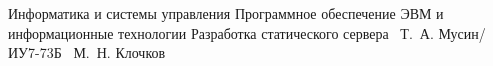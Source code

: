 \documentclass{bmstu}
\begin{document}


\makecourseworktitle
    {Информатика и системы управления}
    {Программное обеспечение ЭВМ и информационные технологии}
    {Разработка статического сервера}
    {~Т.~А. Мусин/ИУ7-73Б}
    {~М.~Н. Клочков}
    {}

\setcounter{page}{3}


\maketableofcontents








\makebibliography


\end{document}
